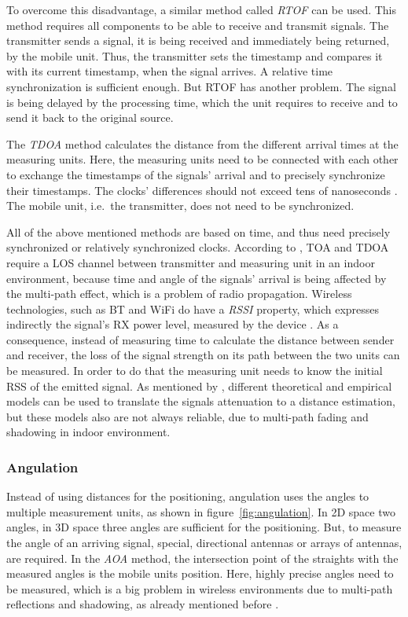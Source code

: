 To overcome this disadvantage, a similar method called \emph{\ac{RTOF}} can be used. This method requires all components to be able to receive and transmit signals. The transmitter sends a signal, it is being received and immediately being returned, by the mobile unit. Thus, the transmitter sets the timestamp and compares it with its current timestamp, when the signal arrives. A relative time synchronization is sufficient enough. But \ac{RTOF} has another problem. The signal is being delayed by the processing time, which the unit requires to receive and to send it back to the original source.

The \emph{\ac{TDOA}} method calculates the distance from the different arrival times at the measuring units. Here, the measuring units need to be connected with each other to exchange the timestamps of the signals' arrival and to precisely synchronize their timestamps. The clocks' differences should not exceed tens of nanoseconds \citep{kotanen:exp_local_pos_bt}. The mobile unit, i.e.\ the transmitter, does not need to be synchronized. 

All of the above mentioned methods are based on time, and thus need precisely synchronized or relatively synchronized clocks. According to \citet{IEEE:survey_wireless_indoor_pos}, \ac{TOA} and \ac{TDOA} require a \ac{LOS} channel between transmitter and measuring unit in an indoor environment, because time and angle of the signals' arrival is being affected by the multi-path effect, which is a problem of radio propagation. Wireless technologies, such as \acl{BT} and WiFi do have a \emph{\ac{RSSI}} property, which expresses indirectly the signal's \ac{RX} power level, measured by the device \citep{kotanen:exp_local_pos_bt}. As a consequence, instead of measuring time to calculate the distance between sender and receiver, the loss of the signal strength on its path between the two units can be measured. In order to do that the measuring unit needs to know the initial \ac{RSS} of the emitted signal. As mentioned by \citet{IEEE:survey_wireless_indoor_pos}, different theoretical and empirical models can be used to translate the signals attenuation to a distance estimation, but these models also are not always reliable, due to multi-path fading and shadowing in indoor environment.

\subsubsection*{Angulation}
Instead of using distances for the positioning, angulation uses the angles to multiple measurement units, as shown in figure~\ref{fig:angulation}. In 2D space two angles, in 3D space three angles are sufficient for the positioning. But, to measure the angle of an arriving signal, special, directional antennas or arrays of antennas, are required. In the \emph{\ac{AOA}} method, the intersection point of the straights with the measured angles is the mobile units position. Here, highly precise angles need to be measured, which is a big problem in wireless environments due to multi-path reflections and shadowing, as already mentioned before \citep{IEEE:survey_wireless_indoor_pos, wang:bt_pos}.

